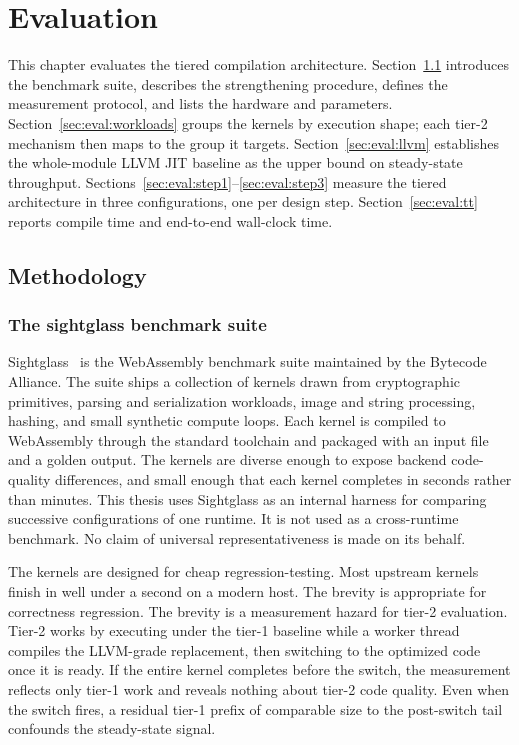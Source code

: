 
\chapter{Evaluation}
\label{ch:evaluation}

This chapter evaluates the tiered compilation architecture. Section~\ref{sec:eval:method} introduces the benchmark suite, describes the strengthening procedure, defines the measurement protocol, and lists the hardware and parameters. Section~\ref{sec:eval:workloads} groups the kernels by execution shape; each tier-2 mechanism then maps to the group it targets. Section~\ref{sec:eval:llvm} establishes the whole-module LLVM JIT baseline as the upper bound on steady-state throughput. Sections~\ref{sec:eval:step1}--\ref{sec:eval:step3} measure the tiered architecture in three configurations, one per design step. Section~\ref{sec:eval:tt} reports compile time and end-to-end wall-clock time.

\section{Methodology}
\label{sec:eval:method}

\subsection{The sightglass benchmark suite}
\label{sec:eval:method:sg}

Sightglass~\cite{sightglass} is the WebAssembly benchmark suite maintained by the Bytecode Alliance. The suite ships a collection of kernels drawn from cryptographic primitives, parsing and serialization workloads, image and string processing, hashing, and small synthetic compute loops. Each kernel is compiled to WebAssembly through the standard toolchain and packaged with an input file and a golden output. The kernels are diverse enough to expose backend code-quality differences, and small enough that each kernel completes in seconds rather than minutes. This thesis uses Sightglass as an internal harness for comparing successive configurations of one runtime. It is not used as a cross-runtime benchmark. No claim of universal representativeness is made on its behalf.

The kernels are designed for cheap regression-testing. Most upstream kernels finish in well under a second on a modern host. The brevity is appropriate for correctness regression. The brevity is a measurement hazard for tier-2 evaluation. Tier-2 works by executing under the tier-1 baseline while a worker thread compiles the LLVM-grade replacement, then switching to the optimized code once it is ready. If the entire kernel completes before the switch, the measurement reflects only tier-1 work and reveals nothing about tier-2 code quality. Even when the switch fires, a residual tier-1 prefix of comparable size to the post-switch tail confounds the steady-state signal.

